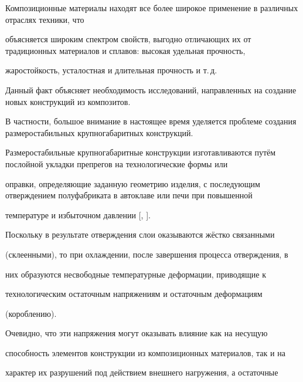\date{10/V/2011}






\maketitle





 Композиционные материалы  находят все более широкое применение в различных отраслях техники, что

объясняется широким спектром свойств, выгодно отличающих их от традиционных материалов и сплавов: высокая удельная прочность,

жаростойкость, усталостная и длительная прочность и т.\,д.



Данный факт объясняет необходимость исследований, направленных на создание новых конструкций из композитов. 

В частности, большое внимание в настоящее время уделяется проблеме создания размеростабильных крупногабаритных конструкций.



Размеростабильные крупногабаритные конструкции изготавливаются путём послойной укладки препрегов на технологические формы или

оправки, определяющие заданную геометрию изделия, с последующим отверждением полуфабриката в автоклаве или печи при повышенной

температуре и избыточном давлении [, ].



Поскольку в результате отверждения слои оказываются жёстко связанными

(склеенными), то при охлаждении, после завершения процесса отверждения, в

них образуются несвободные температурные деформации, приводящие к

технологическим остаточным напряжениям и остаточным деформациям

(короблению).



Очевидно, что эти напряжения могут оказывать влияние как на несущую

способность элементов конструкции из композиционных материалов, так и на

характер их разрушений под действием внешнего нагружения, а остаточные

